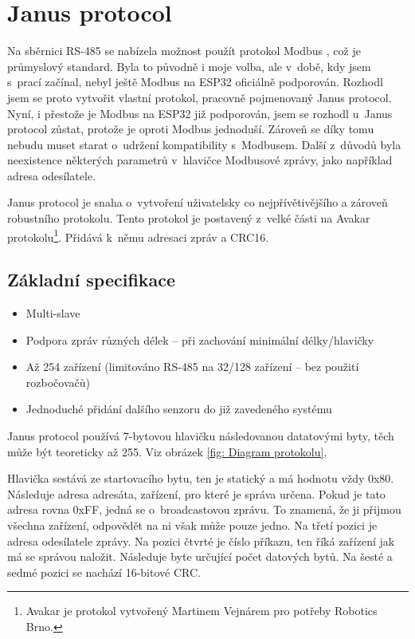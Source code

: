 \chapter{Janus protocol}
Na sběrnici RS-485 se nabízela možnost použít protokol Modbus \cite{modbus}, což je průmyslový standard.
Byla to původně i moje volba, ale v~době, kdy jsem s~prací začínal, nebyl ještě Modbus na ESP32 oficiálně podporován.
Rozhodl jsem se proto vytvořit vlastní protokol, pracovně pojmenovaný Janus protocol.
Nyní, i přestože je Modbus na ESP32 již podporován, jsem se rozhodl u~Janus protocol zůstat, protože je oproti Modbus jednoduší.
Zároveň se díky tomu nebudu muset starat o~udržení kompatibility s~Modbusem.
Další z~důvodů byla neexistence některých parametrů v~hlavičce Modbusové zprávy, jako například adresa odesílatele. 

Janus protocol je snaha o~vytvoření uživatelsky co nejpřívětivějšího a zároveň robustního protokolu.
Tento protokol je postavený z~velké části na Avakar protokolu\cite{avakar}\footnote{Avakar je protokol vytvořený Martinem Vejnárem pro potřeby Robotics Brno.\cite{robotikabrno}}.
Přidává k~němu adresaci zpráv a CRC16.


\section{Základní specifikace}
\begin{itemize}
    \item Multi-slave
    \item Podpora zpráv různých délek -- při zachování minimální délky/hlavičky
    \item Až 254 zařízení (limitováno RS-485 na 32/128 zařízení -- bez použití rozbočovačů)
    \item Jednoduché přidání dalšího senzoru do již zavedeného systému
\end{itemize}

Janus protocol používá 7-bytovou hlavičku následovanou datatovými byty, těch může být teoreticky až 255.
Viz obrázek \ref{fig: Diagram protokolu}.

Hlavička sestává ze startovacího bytu, ten je statický a má hodnotu vždy 0x80.
Následuje adresa adresáta, zařízení, pro které je správa určena.
Pokud je tato adresa rovna 0xFF, jedná se o~broadcastovou zprávu. To znamená, že ji přijmou všechna zařízení, odpovědět na ni však může pouze jedno.
Na třetí pozici je adresa odesílatele zprávy.
Na pozici čtvrté je číslo příkazu, ten říká zařízení jak má se správou naložit.
Následuje byte určující počet datových bytů.
Na šesté a sedmé pozici se nachází 16-bitové CRC.

